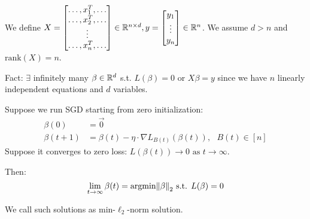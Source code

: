 We define \(X = \begin{bmatrix}
   \ldots, x_1^T, \ldots \\ 
   \ldots, x_2^T, \ldots \\ 
    \vdots \\ 
   \ldots, x_n^T, \ldots  
\end{bmatrix} \in \mathbb{R}^{n \times d}, y = \begin{bmatrix}
    y_1 \\  
    \vdots \\  
    y_n
\end{bmatrix} \in \mathbb{R}^n\).  We assume \(d > n\) and \(\text{rank}(X) = n\). 


Fact: \(\exists\) infinitely many \(\beta \in \mathbb{R}^d\) s.t. \(L(\beta) = 0\) or \(X\beta = y\)
since we have \(n\) linearly independent equations and \(d\) variables. 

\begin{theorem}
    Suppose we run SGD starting from zero initialization: 
    \begin{align*}
        \beta(0) &= \vec{0} \\ 
        \beta(t+1) &= \beta(t) - \eta \cdot \nabla L_{B(t)} \left(\beta(t)\right), \ \ \ B(t) \in [n]
    \end{align*}
    Suppose it converges to zero loss: \(L\left( \beta(t)\right) \to 0 \text{ as } t \to \infty\). 
    
    Then: \[
        \lim_{t \to \infty} \beta (t) = \text{argmin} \norm{\beta}_2 \text{ s.t. } L(\beta) = 0   
    \]
\end{theorem}

\begin{remark}
    We call such solutions as min-\(\ell_2\)-norm solution. 
\end{remark}

